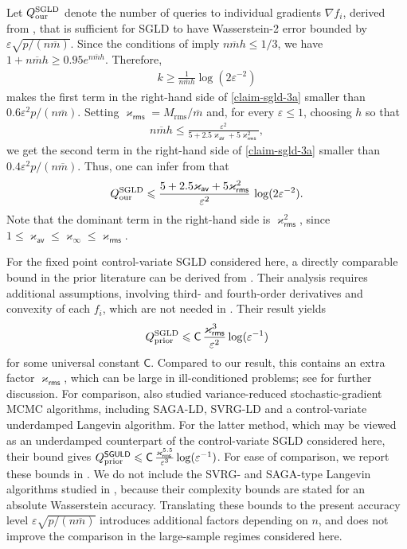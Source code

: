 \documentclass[aos,reqno]{imsart}
\def\kappav{\varkappa_{\textsf{av}}}
\def\kappamax{\varkappa_{\infty}}
\def\kapparms{\varkappa_{\textsf{rms}}}
\def\Mtwo{M_{\mathrm{rms}}}
\def\mbar{\overline m}
\theoremstyle{definition}
\begin{document}
Let $Q^{\rm SGLD}_{\rm our}$ denote the number of queries
to individual gradients $\nabla f_i$, derived from
, that is sufficient for SGLD to have
Wasserstein-2 error bounded by
$\varepsilon\sqrt{p/(n\mbar)}$. Since the conditions of
 imply $n\mbar h\leqslant 1/3$, we have
$1+n\mbar h\geqslant 0.95 e^{n\mbar h}$. Therefore,
\begin{align}
    k \geqslant \frac{1}{n\mbar h}\log(2
    \varepsilon^{-2})
\end{align}
makes the first term in the right-hand side of
\eqref{claim-sgld-3a} smaller than
$0.6\varepsilon^2p/(n\mbar)$. Setting
$\kapparms = \Mtwo/\mbar$ and, for every
$\varepsilon\leqslant 1$, choosing $h$ so that
\begin{align}
    n\mbar h\leqslant \frac{\varepsilon^2}{5 +
    2.5\kappav + 5\kapparms^2},
\end{align}
we get the second term in the right-hand side of
\eqref{claim-sgld-3a} smaller than
$0.4\varepsilon^2 p/(n\mbar)$. Thus, one can infer from
 that
\begin{align}
    Q^{\rm SGLD}_{\rm our}
    \leqslant
    \frac{5 + 2.5\kappav + 5\kapparms^2}
    {\varepsilon^2}\,
    \log(2\varepsilon^{-2}).
\end{align}
Note that the dominant term in the right-hand side is
$\kapparms^2$, since
$1\leqslant \kappav\leqslant\kappamax\leqslant
\kapparms$.

For the fixed point control-variate SGLD considered here,
a directly comparable bound in the prior literature can be
derived from \cite[Theorem 2]{BrosseDM18}. Their analysis
requires additional assumptions, involving third- and
fourth-order derivatives and convexity of each $f_i$, 
which are not needed in . Their result yields
\begin{align}
    Q^{\rm SGLD}_{\rm prior}
    \leqslant
    \textsf{C}\,
    \frac{\kapparms^3}{\varepsilon^2}
    \log(\varepsilon^{-1})
\end{align}
for some universal constant $\textsf{C}$. Compared 
to our result, this contains an extra factor
$\kapparms$, which can be large in ill-conditioned
problems; see  for further discussion.
For comparison, \cite{chatterji2018} also studied
variance-reduced stochastic-gradient MCMC algorithms,
including SAGA-LD, SVRG-LD and a control-variate
underdamped Langevin algorithm. For the latter method,
which may be viewed as an underdamped counterpart of the
control-variate SGLD considered here, their bound gives
$Q^{\sf SGULD}_{\rm prior}\leqslant
\textsf{C}\,\frac{\kapparms^{5.5}}{\varepsilon^3}
\log(\varepsilon^{-1})$. For ease of comparison, we 
report these bounds in
. We do not include the
SVRG- and SAGA-type Langevin algorithms studied in
\cite{chatterji2018}, because their complexity bounds
are stated for an absolute Wasserstein accuracy.
Translating these bounds to the present accuracy level
$\varepsilon\sqrt{p/(n\mbar)}$ introduces additional factors
depending on $n$, and does not improve the comparison in
the large-sample regimes considered here.
\end{document}
